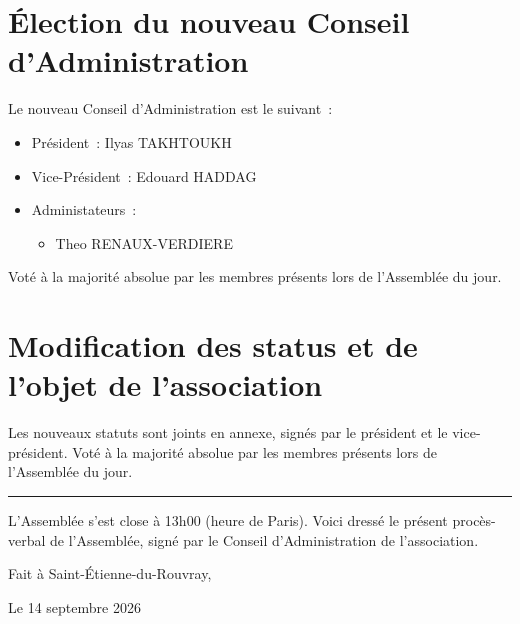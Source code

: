 \documentclass{article}
\newcommand{\mydate}{14 septembre 2026}
\begin{document}
\section{Élection du nouveau Conseil d'Administration}

\begin{flushleft}
  Le nouveau Conseil d'Administration est le suivant~:
  \begin{itemize}
    \item Président~: Ilyas TAKHTOUKH
    \item Vice-Président~: Edouard HADDAG
    \item Administateurs~:
      \begin{itemize}
        \item Theo RENAUX-VERDIERE
      \end{itemize}
  \end{itemize}
\end{flushleft}

Voté à la majorité absolue par les membres présents lors de l'Assemblée du
jour.

\section{Modification des status et de l'objet de l'association}

Les nouveaux statuts sont joints en annexe, signés par le président et le
vice-président. Voté à la majorité absolue par les membres présents lors de
l'Assemblée du jour.

\noindent\rule{\textwidth}{1pt}

\vspace{10pt}

L'Assemblée s'est close à 13h00 (heure de Paris). Voici dressé le présent
procès-verbal de l'Assemblée, signé par le Conseil d'Administration de
l'association.

\vspace{10pt}

\begin{flushright}
  Fait à Saint-Étienne-du-Rouvray,
\end{flushright}

\begin{flushright}
  Le \mydate{}
\end{flushright}
\end{document}
